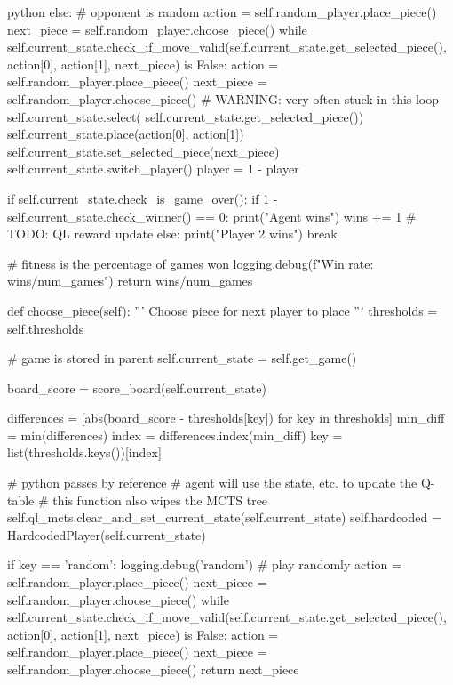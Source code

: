 \begin{mintedbox}{python}
                else:
                    # opponent is random
                    action = self.random_player.place_piece()
                    next_piece = self.random_player.choose_piece()
                    while self.current_state.check_if_move_valid(self.current_state.get_selected_piece(), action[0], action[1], next_piece) is False:
                        action = self.random_player.place_piece()
                        next_piece = self.random_player.choose_piece()
                        # WARNING: very often stuck in this loop
                    self.current_state.select(
                        self.current_state.get_selected_piece())
                    self.current_state.place(action[0], action[1])
                    self.current_state.set_selected_piece(next_piece)
                    self.current_state.switch_player()
                    player = 1 - player

                if self.current_state.check_is_game_over():
                    if 1 - self.current_state.check_winner() == 0:
                        print("Agent wins")
                        wins += 1
                        # TODO: QL reward update
                    else:
                        print("Player 2 wins")
                    break

        # fitness is the percentage of games won
        logging.debug(f"Win rate: {wins/num_games}")
        return wins/num_games

    def choose_piece(self):
        '''
        Choose piece for next player to place
        '''
        thresholds = self.thresholds

        # game is stored in parent
        self.current_state = self.get_game()

        board_score = score_board(self.current_state)

        differences = [abs(board_score - thresholds[key])
                        for key in thresholds]
        min_diff = min(differences)
        index = differences.index(min_diff)
        key = list(thresholds.keys())[index]

        # python passes by reference
        # agent will use the state, etc. to update the Q-table
        # this function also wipes the MCTS tree
        self.ql_mcts.clear_and_set_current_state(self.current_state)
        self.hardcoded = HardcodedPlayer(self.current_state)

        if key == 'random':
            logging.debug('random')
            # play randomly
            action = self.random_player.place_piece()
            next_piece = self.random_player.choose_piece()
            while self.current_state.check_if_move_valid(self.current_state.get_selected_piece(), action[0], action[1], next_piece) is False:
                action = self.random_player.place_piece()
                next_piece = self.random_player.choose_piece()
            return next_piece


\end{mintedbox}
